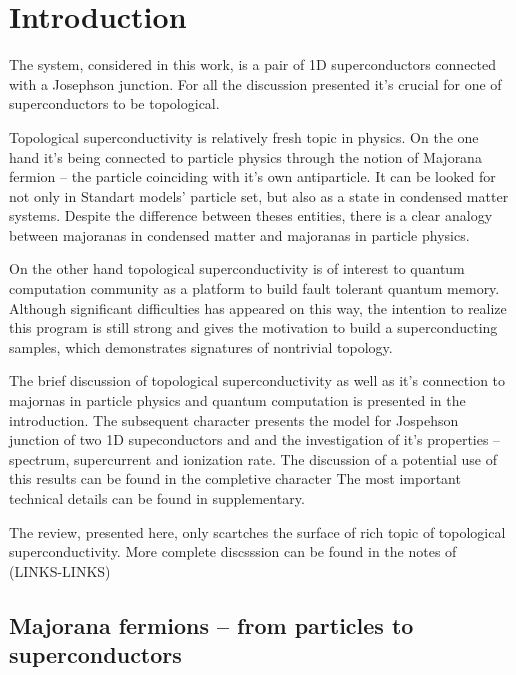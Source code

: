 \chapter{Introduction}


The system, considered in this work, is a pair of 1D superconductors connected with a Josephson junction. For all the discussion presented it's crucial for one of superconductors to be topological. 

Topological superconductivity is relatively fresh topic in physics. On the one hand it's being connected to particle physics through the notion of Majorana fermion -- the particle coinciding with it's own antiparticle. It can be looked for not only in Standart models' particle set, but also as a state in condensed matter systems. Despite the difference between theses entities, there is a clear analogy between majoranas in condensed matter and majoranas in particle physics.

 On the other hand topological superconductivity is of interest to quantum computation community as a platform to build fault tolerant quantum memory. Although significant difficulties has appeared on this way, the intention to realize this program is still strong and gives the motivation to build a superconducting samples, which demonstrates signatures of nontrivial topology.

The brief discussion of topological superconductivity as well as it's connection to majornas in particle physics and quantum computation is presented in the introduction. The subsequent character presents the model for Jospehson junction of two 1D supeconductors  and and the investigation of it's properties -- spectrum, supercurrent and ionization rate. The discussion of a potential use of this results can be found in the	completive character The most important technical details can be found in supplementary.

The review, presented here, only scartches the surface of rich topic of topological superconductivity. More complete discsssion can be found in the notes of (LINKS-LINKS)

\section{Majorana fermions -- from particles to superconductors}


